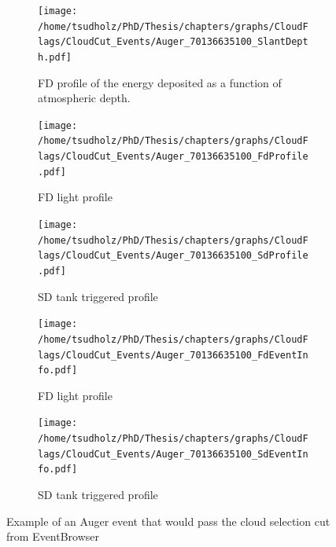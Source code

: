 \begin{figure}
\centering
 \vspace{2cm}
  \begin{subfigure}[b]{\textwidth}
  \centering
  \texttt{[image: /home/tsudholz/PhD/Thesis/chapters/graphs/CloudFlags/CloudCut\_Events/Auger\_70136635100\_SlantDepth.pdf]}
  \caption{FD profile of the energy deposited as a function of atmospheric depth.}
  \end{subfigure}
 \vspace{0.5cm}
  \begin{subfigure}[b]{0.45\textwidth}
  	\centering
  	\texttt{[image: /home/tsudholz/PhD/Thesis/chapters/graphs/CloudFlags/CloudCut\_Events/Auger\_70136635100\_FdProfile.pdf]}
  	\caption{FD light profile}
  \end{subfigure}
  \begin{subfigure}[b]{0.45\textwidth}
  	\centering
  	\texttt{[image: /home/tsudholz/PhD/Thesis/chapters/graphs/CloudFlags/CloudCut\_Events/Auger\_70136635100\_SdProfile.pdf]}
  	\caption{SD tank triggered profile}
  \end{subfigure}

  \begin{subfigure}[b]{0.45\textwidth}
  	\centering
	\texttt{[image: /home/tsudholz/PhD/Thesis/chapters/graphs/CloudFlags/CloudCut\_Events/Auger\_70136635100\_FdEventInfo.pdf]}
  	\caption{FD light profile}
  \end{subfigure}
  \begin{subfigure}[b]{0.45\textwidth}
  	\centering
	\texttt{[image: /home/tsudholz/PhD/Thesis/chapters/graphs/CloudFlags/CloudCut\_Events/Auger\_70136635100\_SdEventInfo.pdf]}
  	\caption{SD tank triggered profile}
  \end{subfigure}
  \caption{Example of an Auger event that would pass the cloud selection cut from EventBrowser}
\end{figure}

